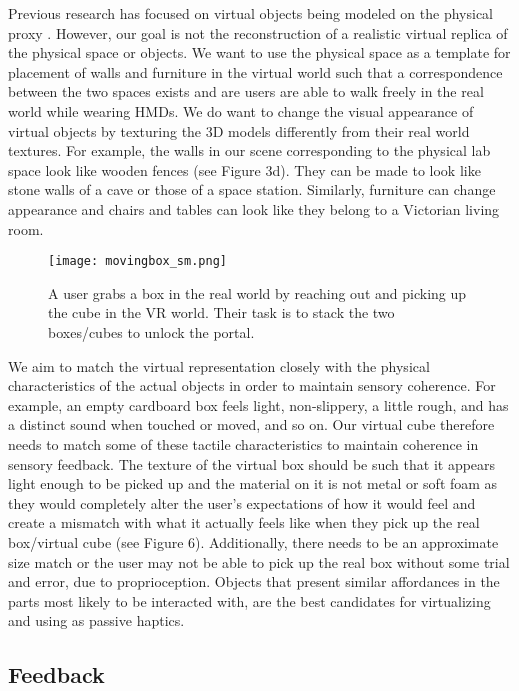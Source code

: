 \documentclass{sigchi}
\begin{document}
Previous research has focused on virtual objects being modeled on the physical proxy \cite{hoffman1998physically}. However, our goal is not the reconstruction of a realistic virtual replica of the physical space or objects. We want to use the physical space as a template for placement of walls and furniture in the virtual world such that a correspondence between the two spaces exists and are users are able to walk freely in the real world while wearing HMDs. We do want to change the visual appearance of virtual objects by texturing the 3D models differently from their real world textures. For example, the walls in our scene corresponding to the physical lab space look like wooden fences (see Figure 3d). They can be made to look like stone walls of a cave or those of a space station. Similarly, furniture can change appearance and chairs and tables can look like they belong to a Victorian living room. 

\begin{figure}[!t]
\centering
\texttt{[image: movingbox\_sm.png]}
\caption{A user grabs a box in the real world by reaching out and picking up the cube in the VR world. Their task is to stack the two boxes/cubes to unlock the portal.}
\label{fig:bridge}
\end{figure}

We aim to match the virtual representation closely with the physical characteristics of the actual objects in order to maintain sensory coherence. For example, an empty cardboard box feels light, non-slippery, a little rough, and has a distinct sound when touched or moved, and so on. Our virtual cube therefore needs to match some of these tactile characteristics to maintain coherence in sensory feedback. The texture of the virtual box should be such that it appears light enough to be picked up and the material on it is not metal or soft foam as they would completely alter the user's expectations of how it would feel and create a mismatch with what it actually feels like when they pick up the real box/virtual cube (see Figure 6). Additionally, there needs to be an approximate size match or the user may not be able to pick up the real box without some trial and error, due to proprioception. Objects that present similar affordances \cite{gibson1977theory} in the parts most likely to be interacted with, are the best candidates for virtualizing and using as passive haptics.  

\subsection{Feedback}
\end{document}
